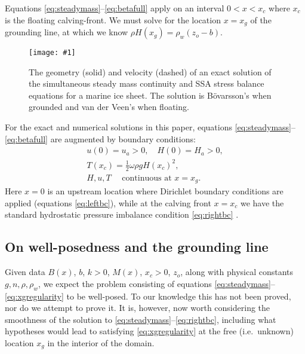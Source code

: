 \documentclass[twocolumn]{igs}
\renewcommand{\dh}{\fontencoding{T1}\selectfont{\symbol{240}}}
\newcommand{\onecol}[1]{\texttt{[image: \#1]}}
\newcommand{\bod}{B\"o\dh varsson\xspace}
\begin{document}
Equations \eqref{eq:steadymass}--\eqref{eq:betafull} apply on an interval $0 < x < x_c$ where $x_c$ is the floating calving-front.  We must solve for the location $x=x_g$ of the grounding line, at which we know $\rho H(x_g) = \rho_w (z_o - b)$.

\begin{figure}[ht]
\onecol{em-geometry}
\caption{The geometry (solid) and velocity (dashed) of an exact solution of the simultaneous steady mass continuity and SSA stress balance equations for a marine ice sheet.  The solution is \bod's when grounded and van der Veen's when floating.} \label{fig:exactmarine}
\end{figure}

For the exact and numerical solutions in this paper, equations \eqref{eq:steadymass}--\eqref{eq:betafull} are augmented by boundary conditions:
\begin{gather}
u(0) = u_a > 0, \quad H(0) = H_a > 0, \label{eq:leftbc} \\
T(x_c) = \frac{1}{2} \omega \rho g H(x_c)^2,  \label{eq:rightbc} \\
H, u, T \quad \text{ continuous at } x = x_g.  \label{eq:xgregularity}
\end{gather}
Here $x=0$ is an upstream location where Dirichlet boundary conditions are applied (equations \eqref{eq:leftbc}), while at the calving front $x=x_c$ we have the standard hydrostatic pressure imbalance condition \eqref{eq:rightbc} \citep{SchoofMarine1}.

\subsection*{On well-posedness and the grounding line}  Given data $B(x)$, $b$, $k>0$, $M(x)$, $x_c>0$, $z_o$, along with physical constants $g,n,\rho,\rho_w$, we expect the problem consisting of equations \eqref{eq:steadymass}--\eqref{eq:xgregularity} to be well-posed.  To our knowledge this has not been proved, nor do we attempt to prove it.  It is, however, now worth considering the smoothness of the solution to \eqref{eq:steadymass}--\eqref{eq:rightbc}, including what hypotheses would lead to satisfying \eqref{eq:xgregularity} at the free (i.e.~unknown) location $x_g$ in the interior of the domain.
\end{document}
